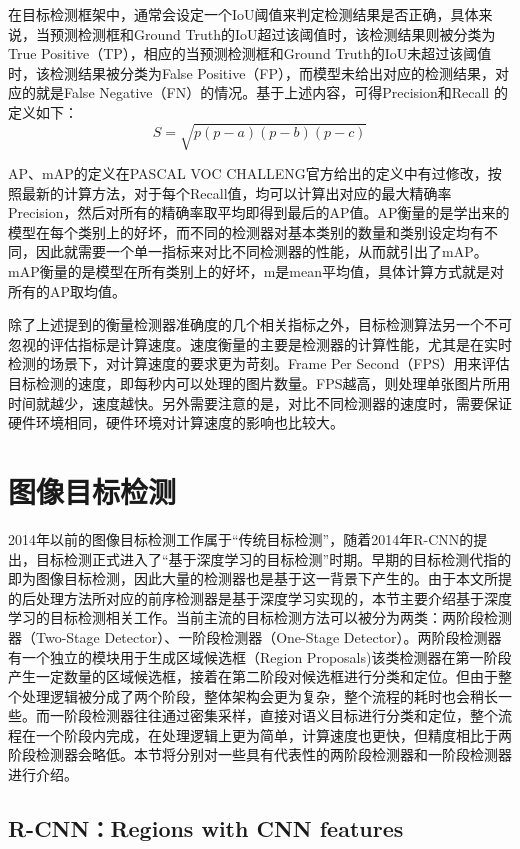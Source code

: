 \documentclass[winfonts,master,twoside,AutoFakeBold= {2}]{njuthesis}
\begin{document}
在目标检测框架中，通常会设定一个IoU阈值来判定检测结果是否正确，具体来说，当预测检测框和Ground Truth的IoU超过该阈值时，该检测结果则被分类为True Positive（TP），相应的当预测检测框和Ground Truth的IoU未超过该阈值时，该检测结果被分类为False Positive（FP），而模型未给出对应的检测结果，对应的就是False Negative（FN）的情况。基于上述内容，可得Precision和Recall
的定义如下：
\begin{equation}
S=\sqrt{p(p-a)(p-b)(p-c)}
\end{equation}

AP、mAP的定义在PASCAL VOC CHALLENG官方给出的定义中有过修改，按照最新的计算方法，对于每个Recall值，均可以计算出对应的最大精确率Precision，然后对所有的精确率取平均即得到最后的AP值。AP衡量的是学出来的模型在每个类别上的好坏，而不同的检测器对基本类别的数量和类别设定均有不同，因此就需要一个单一指标来对比不同检测器的性能，从而就引出了mAP。mAP衡量的是模型在所有类别上的好坏，m是mean平均值，具体计算方式就是对所有的AP取均值。

除了上述提到的衡量检测器准确度的几个相关指标之外，目标检测算法另一个不可忽视的评估指标是计算速度。速度衡量的主要是检测器的计算性能，尤其是在实时检测的场景下，对计算速度的要求更为苛刻。Frame Per Second（FPS）用来评估目标检测的速度，即每秒内可以处理的图片数量。FPS越高，则处理单张图片所用时间就越少，速度越快。另外需要注意的是，对比不同检测器的速度时，需要保证硬件环境相同，硬件环境对计算速度的影响也比较大。
\section{图像目标检测}
2014年以前的图像目标检测工作属于“传统目标检测”，随着2014年R-CNN的提出，目标检测正式进入了“基于深度学习的目标检测”时期。早期的目标检测代指的即为图像目标检测，因此大量的检测器也是基于这一背景下产生的。由于本文所提的后处理方法所对应的前序检测器是基于深度学习实现的，本节主要介绍基于深度学习的目标检测相关工作。当前主流的目标检测方法可以被分为两类：两阶段检测器（Two-Stage Detector）、一阶段检测器（One-Stage Detector）。两阶段检测器有一个独立的模块用于生成区域候选框（Region Proposals)该类检测器在第一阶段产生一定数量的区域候选框，接着在第二阶段对候选框进行分类和定位。但由于整个处理逻辑被分成了两个阶段，整体架构会更为复杂，整个流程的耗时也会稍长一些。而一阶段检测器往往通过密集采样，直接对语义目标进行分类和定位，整个流程在一个阶段内完成，在处理逻辑上更为简单，计算速度也更快，但精度相比于两阶段检测器会略低。本节将分别对一些具有代表性的两阶段检测器和一阶段检测器进行介绍。
\subsection{R-CNN：Regions with CNN features}
\end{document}
